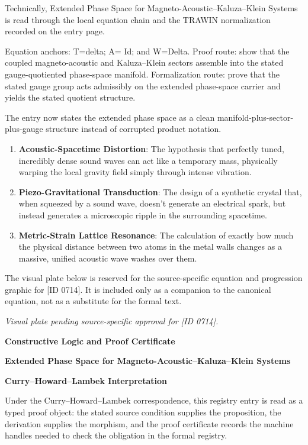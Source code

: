 Technically, Extended Phase Space for Magneto-Acoustic--Kaluza--Klein Systems is read through the local equation chain and the TRAWIN normalization recorded on the entry page.

Equation anchors: T=delta; A= Id; and W=Delta. Proof route: show that the coupled magneto-acoustic and Kaluza--Klein sectors assemble into the stated gauge-quotiented phase-space manifold. Formalization route: prove that the stated gauge group acts admissibly on the extended phase-space carrier and yields the stated quotient structure.

The entry now states the extended phase space as a clean manifold-plus-sector-plus-gauge structure instead of corrupted product notation.
\endgroup

\begin{enumerate}[leftmargin=1.6em,itemsep=6pt,topsep=4pt]
\item \textbf{Acoustic-Spacetime Distortion}: The hypothesis that perfectly tuned, incredibly dense sound waves can act like a temporary mass, physically warping the local gravity field simply through intense vibration.
\item \textbf{Piezo-Gravitational Transduction}: The design of a synthetic crystal that, when squeezed by a sound wave, doesn't generate an electrical spark, but instead generates a microscopic ripple in the surrounding spacetime.
\item \textbf{Metric-Strain Lattice Resonance}: The calculation of exactly how much the physical distance between two atoms in the metal walls changes as a massive, unified acoustic wave washes over them.
\end{enumerate}

\begingroup\footnotesize\sloppy
The visual plate below is reserved for the source-specific equation and progression graphic for [ID 0714]. It is included only as a companion to the canonical equation, not as a substitute for the formal text.
\par\endgroup
\begingroup\footnotesize\itshape
Visual plate pending source-specific approval for [ID 0714].
\par\endgroup

\clearpage
\begingroup\tzpsupportsetup
\noindent\textbf{\fontsize{10.8pt}{12.8pt}\selectfont [ID 0714] Constructive Logic and Proof Certificate}\par
\noindent\textbf{\fontsize{10pt}{12pt}\selectfont Extended Phase Space for Magneto-Acoustic--Kaluza--Klein Systems}\par
\vspace{0.45em}
\begingroup
\footnotesize
\setlength{\parskip}{0.22em}
\setlength{\parindent}{0pt}
\noindent\textbf{Curry--Howard--Lambek Interpretation}\par
Under the Curry--Howard--Lambek correspondence, this registry entry is read as a typed proof
object: the stated source condition supplies the proposition, the derivation supplies the
morphism, and the proof certificate records the machine handles needed to check the obligation
in the formal registry.


